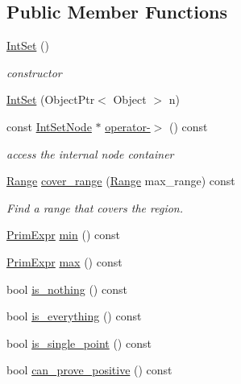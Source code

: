 \subsection*{Public Member Functions}
\begin{DoxyCompactItemize}
\item 
\hyperlink{classtvm_1_1arith_1_1IntSet_a94870e317c0fe710b6aab013df335fb4}{Int\+Set} ()
\begin{DoxyCompactList}\small\item\em constructor \end{DoxyCompactList}\item 
\hyperlink{classtvm_1_1arith_1_1IntSet_a0d9b20e40ac72352647969cc1430b881}{Int\+Set} (Object\+Ptr$<$ Object $>$ n)
\item 
const \hyperlink{classtvm_1_1arith_1_1IntSetNode}{Int\+Set\+Node} $\ast$ \hyperlink{classtvm_1_1arith_1_1IntSet_aaea2d5a2e766abae102bf56f3ee5ec35}{operator-\/$>$} () const 
\begin{DoxyCompactList}\small\item\em access the internal node container \end{DoxyCompactList}\item 
\hyperlink{classtvm_1_1Range}{Range} \hyperlink{classtvm_1_1arith_1_1IntSet_a87331de8815851fcd10bf5e3b878062e}{cover\+\_\+range} (\hyperlink{classtvm_1_1Range}{Range} max\+\_\+range) const 
\begin{DoxyCompactList}\small\item\em Find a range that covers the region. \end{DoxyCompactList}\item 
\hyperlink{classtvm_1_1PrimExpr}{Prim\+Expr} \hyperlink{classtvm_1_1arith_1_1IntSet_ab4b94806a72afc801f392b6c1e09b2bd}{min} () const 
\item 
\hyperlink{classtvm_1_1PrimExpr}{Prim\+Expr} \hyperlink{classtvm_1_1arith_1_1IntSet_afc04d6fd5d46def5dff8f69d344df107}{max} () const 
\item 
bool \hyperlink{classtvm_1_1arith_1_1IntSet_a360733fbb5026aa3b451c948447cf868}{is\+\_\+nothing} () const 
\item 
bool \hyperlink{classtvm_1_1arith_1_1IntSet_a76915ad1257dba46982dca412164193a}{is\+\_\+everything} () const 
\item 
bool \hyperlink{classtvm_1_1arith_1_1IntSet_a2a8851c9c9d80dc4fef43919f069e828}{is\+\_\+single\+\_\+point} () const 
\item 
bool \hyperlink{classtvm_1_1arith_1_1IntSet_a217b7d0c997ecd1752b590778f4ea8fb}{can\+\_\+prove\+\_\+positive} () const 

\end{DoxyCompactItemize}
